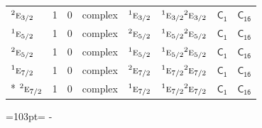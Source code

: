 \documentclass[10pt,a4paper]{article}
\newcommand{\needspace}[1]{\par\penalty-100\begingroup\dimen0=#1\relax\dimen2=\pagegoal
  \advance\dimen2-\pagetotal\ifdim\dimen0>\dimen2\relax\ifdim\dimen2>0pt\vfil\break\fi\fi
  \endgroup}
\numberwithin{equation}{section}
\newcommand{\grp}[1]{\mathsf{#1}}
\newcommand{\irr}[1]{\text{\normalfont\scshape #1}}
\newcommand{\conjpair}[1]{{}^{#1}}
\begin{document}
{\begin{longtable}{@{}lrrlllll@{}}
$\conjpair{2}\irr{e}_{3/2}$ & 1 & $0$ & complex & $\conjpair{1}\irr{e}_{3/2}$ & $\conjpair{1}\irr{e}_{3/2}\conjpair{2}\irr{e}_{3/2}$ & \href{C1.pdf}{$\grp{C_{1}}$} & $\grp{C_{16}}$\\
$\conjpair{1}\irr{e}_{5/2}$ & 1 & $0$ & complex & $\conjpair{2}\irr{e}_{5/2}$ & $\conjpair{1}\irr{e}_{5/2}\conjpair{2}\irr{e}_{5/2}$ & \href{C1.pdf}{$\grp{C_{1}}$} & $\grp{C_{16}}$\\
$\conjpair{2}\irr{e}_{5/2}$ & 1 & $0$ & complex & $\conjpair{1}\irr{e}_{5/2}$ & $\conjpair{1}\irr{e}_{5/2}\conjpair{2}\irr{e}_{5/2}$ & \href{C1.pdf}{$\grp{C_{1}}$} & $\grp{C_{16}}$\\
$\conjpair{1}\irr{e}_{7/2}$ & 1 & $0$ & complex & $\conjpair{2}\irr{e}_{7/2}$ & $\conjpair{1}\irr{e}_{7/2}\conjpair{2}\irr{e}_{7/2}$ & \href{C1.pdf}{$\grp{C_{1}}$} & $\grp{C_{16}}$\\*
$\conjpair{2}\irr{e}_{7/2}$ & 1 & $0$ & complex & $\conjpair{1}\irr{e}_{7/2}$ & $\conjpair{1}\irr{e}_{7/2}\conjpair{2}\irr{e}_{7/2}$ & \href{C1.pdf}{$\grp{C_{1}}$} & $\grp{C_{16}}$\\
\bottomrule\end{longtable}}
\needspace{103pt}
\end{document}
